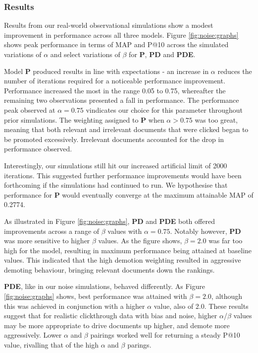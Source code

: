 \subsubsection{Results}
Results from our real-world observational simulations show a modest improvement in performance across all three models. Figure \ref{fig:noise:graphs} shows peak performance in terms of MAP and P@10 across the simulated variations of $\alpha$ and select variations of $\beta$ for \textbf{P}, \textbf{PD} and \textbf{PDE}.

Model \textbf{P} produced results in line with expectations - an increase in $\alpha$ reduces the number of iterations required for a noticeable performance improvement. Performance increased the most in the range 0.05 to 0.75, whereafter the remaining two observations presented a fall in performance. The performance peak observed at $\alpha = 0.75$ vindicates our choice for this parameter throughout prior simulations. The weighting assigned to \textbf{P} when $\alpha > 0.75$ was too great, meaning that both relevant and irrelevant documents that were clicked began to be promoted excessively. Irrelevant documents accounted for the drop in performance observed.

Interestingly, our simulations still hit our increased artificial limit of 2000 iterations. This suggested further performance improvements would have been forthcoming if the simulations had continued to run. We hypothesise that performance for \textbf{P} would eventually converge at the maximum attainable MAP of 0.2774.

As illustrated in Figure \ref{fig:noise:graphs}, \textbf{PD} and \textbf{PDE} both offered improvements across a range of $\beta$ values with $\alpha = 0.75$. Notably however, \textbf{PD} was more sensitive to higher $\beta$ values. As the figure shows, $\beta = 2.0$ was far too high for the model, resulting in maximum performance being attained at baseline values. This indicated that the high demotion weighting resulted in aggressive demoting behaviour, bringing relevant documents down the rankings.

\textbf{PDE}, like in our noise simulations, behaved differently. As Figure \ref{fig:noise:graphs} shows, best performance was attained with $\beta = 2.0$, although this was achieved in conjunction with a higher $\alpha$ value, also of 2.0. These results suggest that for realistic clickthrough data with bias and noise, higher $\alpha$/$\beta$ values may be more appropriate to drive documents up higher, and demote more aggressively. Lower $\alpha$ and $\beta$ pairings worked well for returning a steady P@10 value, rivalling that of the high $\alpha$ and $\beta$ parings.

